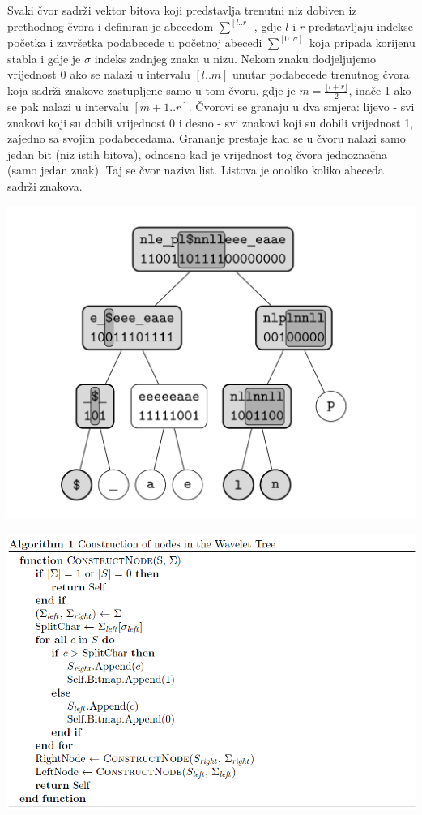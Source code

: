 \documentclass[times, utf8, seminar, numeric]{fer}
\newcommand\floor[1]{\lfloor#1\rfloor}
\begin{document}
\par Svaki čvor sadrži vektor bitova koji predstavlja trenutni niz dobiven iz prethodnog čvora i definiran je abecedom $\sum^{[l..r]}$, gdje $l$ i $r$ predstavljaju indekse početka i završetka podabecede u početnoj abecedi $\sum^{[0..\sigma]}$ koja pripada korijenu stabla i gdje je $\sigma$ indeks zadnjeg znaka u nizu. Nekom znaku dodjeljujemo vrijednost 0 ako se nalazi u intervalu $[l..m]$ unutar podabecede trenutnog čvora koja sadrži znakove zastupljene samo u tom čvoru, gdje je $m = \frac{\floor{l + r}}{2}$, inače 1 ako se pak nalazi u intervalu $[m + 1..r]$. Čvorovi se granaju u dva smjera: lijevo - svi znakovi koji su dobili vrijednost 0 i desno - svi znakovi koji su dobili vrijednost 1, zajedno sa svojim podabecedama. Grananje prestaje kad se u čvoru nalazi samo jedan bit (niz istih bitova), odnosno kad je vrijednost tog čvora jednoznačna (samo jedan znak). Taj se čvor naziva list. Listova je onoliko koliko abeceda sadrži znakova.\cite{Beller2011}
\begin{center}
	\includegraphics[scale=0.48]{slike/wavelet_tree.png}
\end{center}
\begin{center}
	\includegraphics[scale=0.5]{slike/izradnja_wt.png}
\end{center}
\end{document}
